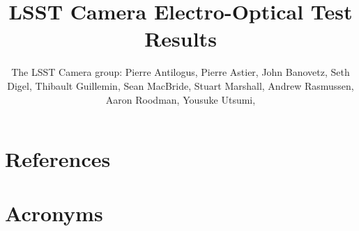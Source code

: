 \documentclass[SE,lsstdraft,authoryear,toc]{lsstdoc}
\title{LSST Camera Electro-Optical Test Results}
\author{%
The LSST Camera group:
Pierre Antilogus,
Pierre Astier,
John Banovetz,
Seth Digel,
Thibault Guillemin,
Sean MacBride,
Stuart Marshall,
Andrew Rasmussen,
Aaron Roodman,
Yousuke Utsumi,
}
\date{\vcsDate}
\begin{document}
\maketitle


\appendix
\section{References} \label{sec:bib}
%
%



\section{Acronyms} \label{sec:acronyms}

\end{document}
